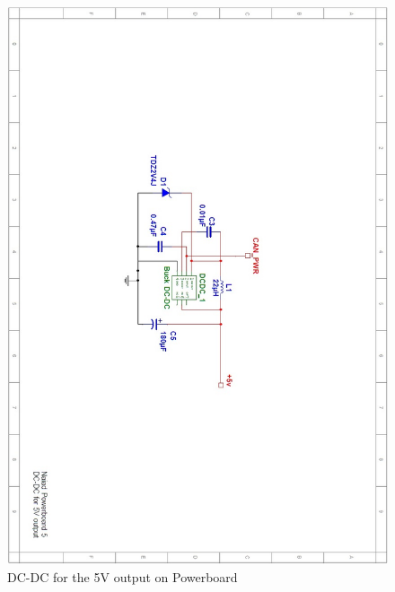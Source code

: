 \begin{figure}[!ht]
	\begin{center}
		\includegraphics[width=13.2cm]{./Images/Powerboard_Scematics/5_out.jpg}
		\caption{DC-DC for the 5V output on Powerboard}
	\end{center}
\end{figure}

